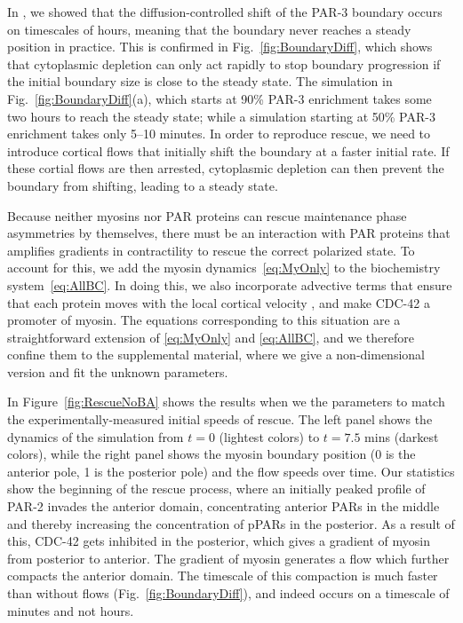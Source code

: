 \documentclass[11pt]{article}
\newcommand{\6}[1]{#1_{\text{6}}}
\newcommand{\3}[1]{#1_{\text{3}}}
\begin{document}
In \citep{lang2023oligomerization}, we showed that the diffusion-controlled shift of the PAR-3 boundary occurs on timescales of hours, meaning that the boundary never reaches a steady position in practice. This is confirmed in Fig.\ \ref{fig:BoundaryDiff}, which shows that cytoplasmic depletion can only act rapidly to stop boundary progression if the initial boundary size is close to the steady state. The simulation in Fig.\ \ref{fig:BoundaryDiff}(a), which starts at 90\% PAR-3 enrichment takes some two hours to reach the steady state; while a simulation starting at 50\% PAR-3 enrichment takes only 5--10 minutes. In order to reproduce rescue, we need to introduce cortical flows that initially shift the boundary at a faster initial rate. If these cortial flows are then arrested, cytoplasmic depletion can then prevent the boundary from shifting, leading to a steady state.


Because neither myosins nor PAR proteins can rescue maintenance phase asymmetries by themselves, there must be an interaction with PAR proteins that amplifies gradients in contractility to rescue the correct polarized state. To account for this, we add the myosin dynamics\ \eqref{eq:MyOnly} to the biochemistry system\ \eqref{eq:AllBC}. In doing this, we also incorporate advective terms that ensure that each protein moves with the local cortical velocity \citep{illukkumbura2023design}, and make CDC-42 a promoter of myosin. The equations corresponding to this situation are a straightforward extension of \eqref{eq:MyOnly} and \eqref{eq:AllBC}, and we therefore confine them to the supplemental material, where we give a non-dimensional version and fit the unknown parameters.

In Figure\ \ref{fig:RescueNoBA} shows the results when we the parameters to match the experimentally-measured initial speeds of rescue. The left panel shows the dynamics of the simulation from $t=0$ (lightest colors) to $t=7.5$ mins (darkest colors), while the right panel shows the myosin boundary position (0 is the anterior pole, 1 is the posterior pole) and the flow speeds over time. Our statistics show the beginning of the rescue process, where an initially peaked profile of PAR-2 invades the anterior domain, concentrating anterior PARs in the middle and thereby increasing the concentration of pPARs in the posterior. As a result of this, CDC-42 gets inhibited in the posterior, which gives a gradient of myosin from posterior to anterior. The gradient of myosin generates a flow which further compacts the anterior domain. The timescale of this compaction is much faster than without flows (Fig.\ \ref{fig:BoundaryDiff}), and indeed occurs on a timescale of minutes and not hours.
\end{document}
